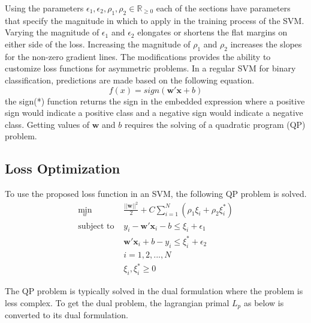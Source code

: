 Using the parameters $\epsilon_1, \epsilon_2, \rho_1, \rho_2 \in\mathbb{R}_{\geq0}$ each of the sections have parameters that specify the magnitude in which to apply in the training process of the SVM. Varying the magnitude of $\epsilon_1$ and $\epsilon_2$ elongates or shortens the flat margins on either side of the loss. Increasing the magnitude of $\rho_1$ and $\rho_2$ increases the slopes for the non-zero gradient lines. The modifications provides the ability to customize loss functions for asymmetric problems. In a regular SVM for binary classification, predictions are made based on the following equation.
\begin{equation} \label{Eq:PredictionEqn}
f(x)=sign(\mathbf{w}'\mathbf{x}+b)
\end{equation}
the sign(*) function returns the sign in the embedded expression where a positive sign would indicate a positive class and a negative sign would indicate a negative class. Getting values of $\mathbf{w}$ and $b$ requires the solving of a quadratic program (QP) problem. 

\subsection{Loss Optimization}
To use the proposed loss function in an SVM, the following QP problem is solved.
\begin{equation} \label{Eq:QuantileSVMa}
\begin{array}{cc}
\displaystyle\min_w& \frac{||\mathbf{w}||^2}{2}+C\displaystyle\sum_{i=1}^N(\rho_1\xi_i + \rho_2\xi_i^*) \\
\text{subject to    } & y_i - \mathbf{w}'\mathbf{x}_i - b \leq \xi_i + \epsilon_1 \\
 & \mathbf{w}'\mathbf{x}_i + b -y_i \leq \xi_i^* + \epsilon_2 \\
&i=1,2,...,N\\
&\xi_i,\xi_i^* \geq 0
\end{array}
\end{equation}

The QP problem is typically solved in the dual formulation where the problem is less complex. To get the dual problem, the lagrangian primal $L_p$ as below is converted to its dual formulation.

